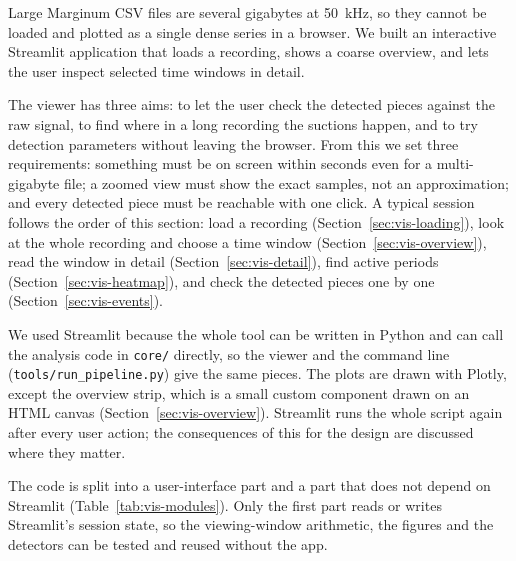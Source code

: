 Large Marginum CSV files are several gigabytes at \SI{50}{\kilo\hertz}, so they cannot be
loaded and plotted as a single dense series in a browser. We built an interactive
Streamlit application that loads a recording, shows a coarse overview, and lets the user
inspect selected time windows in detail.

The viewer has three aims: to let the user check the detected pieces against the raw
signal, to find where in a long recording the suctions happen, and to try detection
parameters without leaving the browser. From this we set three requirements: something
must be on screen within seconds even for a multi-gigabyte file; a zoomed view must show
the exact samples, not an approximation; and every detected piece must be reachable with
one click. A typical session follows the order of this section: load a recording
(Section~\ref{sec:vis-loading}), look at the whole recording and choose a time window
(Section~\ref{sec:vis-overview}), read the window in detail (Section~\ref{sec:vis-detail}),
find active periods (Section~\ref{sec:vis-heatmap}), and check the detected pieces one by
one (Section~\ref{sec:vis-events}).

We used Streamlit because the whole tool can be written in Python and can call the
analysis code in \texttt{core/} directly, so the viewer and the command line
(\texttt{tools/run\_pipeline.py}) give the same pieces. The plots are drawn with Plotly,
except the overview strip, which is a small custom component drawn on an HTML canvas
(Section~\ref{sec:vis-overview}). Streamlit runs the whole script again after every user
action; the consequences of this for the design are discussed where they matter.

The code is split into a user-interface part and a part that does not depend on
Streamlit (Table~\ref{tab:vis-modules}). Only the first part reads or writes Streamlit's
session state, so the viewing-window arithmetic, the figures and the detectors can be
tested and reused without the app.

